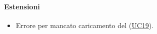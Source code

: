 \paragraph*{Estensioni}
\begin{itemize}
  \item Errore per mancato caricamento del  (\hyperref[UC19]{UC19}).
\end{itemize}